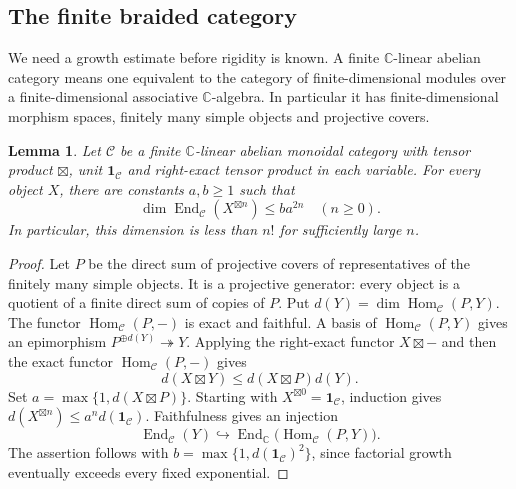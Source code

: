\documentclass[11pt,reqno]{amsart}
\newtheorem{lemma}[theorem]{Lemma}
\theoremstyle{definition}\newtheorem{definition}[theorem]{Definition}
\theoremstyle{remark}\newtheorem{remark}[theorem]{Remark}
\newcommand{\C}{\mathbb C}\newcommand{\Z}{\mathbb Z}\newcommand{\Q}{\mathbb Q}
\numberwithin{equation}{section}
\begin{document}
\subsection{The finite braided category}
We need a growth estimate before rigidity is known. A finite $\C$-linear abelian category means one equivalent to the category of finite-dimensional modules over a finite-dimensional associative $\C$-algebra. In particular it has finite-dimensional morphism spaces, finitely many simple objects and projective covers.

\begin{lemma}\label{lem:moderategrowth}
Let $\mathcal C$ be a finite $\C$-linear abelian monoidal category with tensor product $\boxtimes$, unit $\mathbf1_{\mathcal C}$ and right-exact tensor product in each variable. For every object $X$, there are constants $a,b\ge1$ such that
\[
 \dim\operatorname{End}_{\mathcal C}(X^{\boxtimes n})\le b a^{2n}
 \quad(n\ge0).
\]
In particular, this dimension is less than $n!$ for sufficiently large $n$.
\end{lemma}
\begin{proof}
Let $P$ be the direct sum of projective covers of representatives of the finitely many simple objects. It is a projective generator: every object is a quotient of a finite direct sum of copies of $P$. Put $d(Y)=\dim\operatorname{Hom}_{\mathcal C}(P,Y)$. The functor $\operatorname{Hom}_{\mathcal C}(P,-)$ is exact and faithful. A basis of $\operatorname{Hom}_{\mathcal C}(P,Y)$ gives an epimorphism $P^{\oplus d(Y)}\twoheadrightarrow Y$. Applying the right-exact functor $X\boxtimes-$ and then the exact functor $\operatorname{Hom}_{\mathcal C}(P,-)$ gives
\[
 d(X\boxtimes Y)\le d(X\boxtimes P)d(Y).
\]
Set $a=\max\{1,d(X\boxtimes P)\}$. Starting with $X^{\boxtimes0}=\mathbf1_{\mathcal C}$, induction gives $d(X^{\boxtimes n})\le a^n d(\mathbf1_{\mathcal C})$. Faithfulness gives an injection
\[
 \operatorname{End}_{\mathcal C}(Y)\hookrightarrow
 \operatorname{End}_{\C}\bigl(\operatorname{Hom}_{\mathcal C}(P,Y)\bigr).
\]
The assertion follows with $b=\max\{1,d(\mathbf1_{\mathcal C})^2\}$, since factorial growth eventually exceeds every fixed exponential.
\end{proof}
\end{document}

